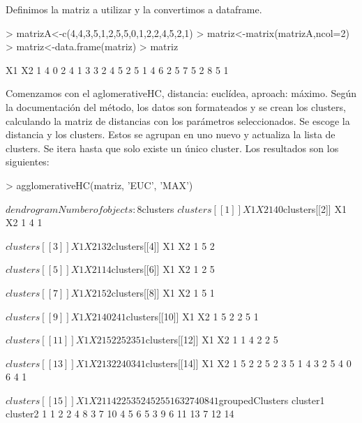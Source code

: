 \documentclass[a4paper]{article}
\begin{document}
Definimos la matriz a utilizar y la convertimos a dataframe.

\begin{Schunk}
\begin{Sinput}
> matrizA<-c(4,4,3,5,1,2,5,5,0,1,2,2,4,5,2,1)
> matriz<-matrix(matrizA,ncol=2)
> matriz<-data.frame(matriz)
> matriz
\end{Sinput}
\begin{Soutput}
  X1 X2
1  4  0
2  4  1
3  3  2
4  5  2
5  1  4
6  2  5
7  5  2
8  5  1
\end{Soutput}
\end{Schunk}

Comenzamos con el aglomerativeHC, distancia: euclídea, aproach: máximo.
Según la documentación del método, los datos son formateados y se crean los clusters, calculando la matriz de distancias con los parámetros seleccionados. Se escoge la distancia y los clusters. Estos se agrupan en uno nuevo y actualiza la lista de clusters. Se itera hasta que solo existe un único cluster.
Los resultados son los siguientes:
\begin{Schunk}
\begin{Sinput}
> agglomerativeHC(matriz, 'EUC', 'MAX')
\end{Sinput}
\begin{Soutput}
$dendrogram
Number of objects: 8 


$clusters
$clusters[[1]]
  X1 X2
1  4  0

$clusters[[2]]
  X1 X2
1  4  1

$clusters[[3]]
  X1 X2
1  3  2

$clusters[[4]]
  X1 X2
1  5  2

$clusters[[5]]
  X1 X2
1  1  4

$clusters[[6]]
  X1 X2
1  2  5

$clusters[[7]]
  X1 X2
1  5  2

$clusters[[8]]
  X1 X2
1  5  1

$clusters[[9]]
  X1 X2
1  4  0
2  4  1

$clusters[[10]]
  X1 X2
1  5  2
2  5  1

$clusters[[11]]
  X1 X2
1  5  2
2  5  2
3  5  1

$clusters[[12]]
  X1 X2
1  1  4
2  2  5

$clusters[[13]]
  X1 X2
1  3  2
2  4  0
3  4  1

$clusters[[14]]
  X1 X2
1  5  2
2  5  2
3  5  1
4  3  2
5  4  0
6  4  1

$clusters[[15]]
  X1 X2
1  1  4
2  2  5
3  5  2
4  5  2
5  5  1
6  3  2
7  4  0
8  4  1


$groupedClusters
  cluster1 cluster2
1        1        2
2        4        8
3        7       10
4        5        6
5        3        9
6       11       13
7       12       14
\end{Soutput}
\end{Schunk}
\end{document}
